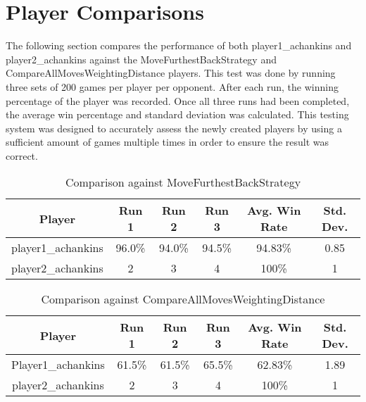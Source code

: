 \documentclass[
	12pt, %
]{fphw}
\begin{document}

\section*{Player Comparisons}

\quad \quad The following section compares the performance of both player1\_achankins and player2\_achankins against the MoveFurthestBackStrategy and CompareAllMovesWeightingDistance players. This test was done by running three sets of 200 games per player per opponent. After each run, the winning percentage of the player was recorded. Once all three runs had been completed, the average win percentage and standard deviation was calculated. This testing system was designed to accurately assess the newly created players by using a sufficient amount of games multiple times in order to ensure the result was correct.

\begin{table}[ht]
	\centering
	\begin{tabular}{||c | c c c c c||}
		\hline
		Player & Run 1&   Run 2 & Run 3 & Avg. Win Rate & Std. Dev. \\ [0.5ex]
		\hline\hline
		player1\_achankins &  96.0\% & 94.0\% & 94.5\% & 94.83\% & 0.85 \\
		\hline
		player2\_achankins & 2 & 3 & 4 & 100\% & 1 \\ [1ex]
		\hline
	\end{tabular}
	\caption{Comparison against MoveFurthestBackStrategy}
	\label{table:6}
\end{table}

\begin{table}[ht]
	\centering
	\begin{tabular}{||c | c c c c c||}
		\hline
		Player & Run 1 &   Run 2 & Run 3  & Avg. Win Rate & Std. Dev. \\ [0.5ex]
		\hline\hline
		Player1\_achankins &  61.5\% & 61.5\% & 65.5\% & 62.83\% & 1.89 \\
		\hline
		player2\_achankins & 2 & 3 & 4 & 100\% & 1 \\ [1ex]
		\hline
	\end{tabular}
	\caption{Comparison against CompareAllMovesWeightingDistance}
	\label{table:7}
\end{table}

\end{document}
